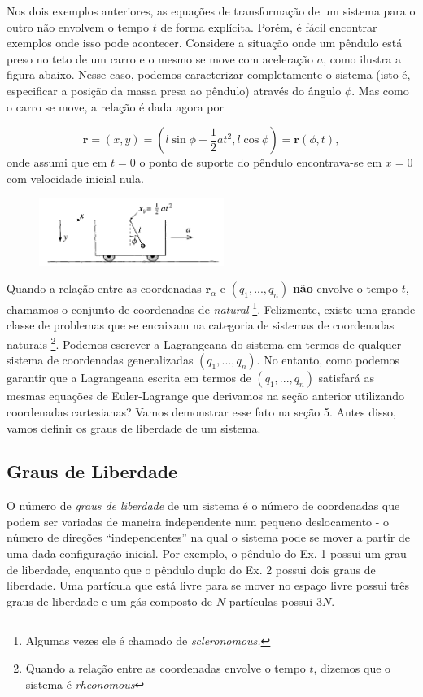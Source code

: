 \documentclass{article}
\begin{document}
Nos dois exemplos anteriores, as equações de transformação de um sistema para o outro não envolvem o tempo $t$ de forma explícita. Porém, é fácil encontrar exemplos onde isso pode acontecer. Considere a situação onde um pêndulo está preso no teto de um carro e o mesmo se move com aceleração $a$, como ilustra a figura abaixo. Nesse caso, podemos caracterizar completamente o sistema (isto é, especificar a posição da massa presa ao pêndulo) através do ângulo $\phi$. Mas como o carro se move, a relação é dada agora por

\begin{equation}
    \mathbf{r} = (x,y) = (l\sin\phi + \frac{1}{2}at^2,l\cos\phi) = \mathbf{r}(\phi,t),
\end{equation}
onde assumi que em $t = 0$ o ponto de suporte do pêndulo encontrava-se em $x = 0$ com velocidade inicial nula.
\begin{figure}[h]
\centering
\includegraphics[width=6cm]{car.png}
\end{figure}

Quando a relação entre as coordenadas $\mathbf{r}_\alpha$ e $(q_{1},...,q_n)$ \textbf{não} envolve o tempo $t$, chamamos o conjunto de coordenadas de \textit{natural} \footnote{Algumas vezes ele é chamado de \textit{scleronomous.}}. Felizmente, existe uma grande classe de problemas que se encaixam na categoria de sistemas de coordenadas naturais \footnote{Quando a relação entre as coordenadas envolve o tempo $t$, dizemos que o sistema é \textit{rheonomous}}. Podemos escrever a Lagrangeana do sistema em termos de qualquer sistema de coordenadas generalizadas $(q_1,...,q_n)$. No entanto, como podemos garantir que a Lagrangeana escrita em termos de $(q_1,...,q_n)$ satisfará as mesmas equações de Euler-Lagrange que derivamos na seção anterior utilizando coordenadas cartesianas? Vamos demonstrar esse fato na seção 5. Antes disso, vamos definir os graus de liberdade de um sistema.

\subsection{Graus de Liberdade}

O número de \textit{graus de liberdade} de um sistema é o número de coordenadas que podem ser variadas de maneira independente num pequeno deslocamento - o número de direções ``independentes'' na qual o sistema pode se mover a partir de uma dada configuração inicial. Por exemplo, o pêndulo do Ex. 1 possui um grau de liberdade, enquanto que o pêndulo duplo do Ex. 2 possui dois graus de liberdade. Uma partícula que está livre para se mover no espaço livre possui três graus de liberdade e um gás composto de $N$ partículas possui $3N$.
\end{document}
